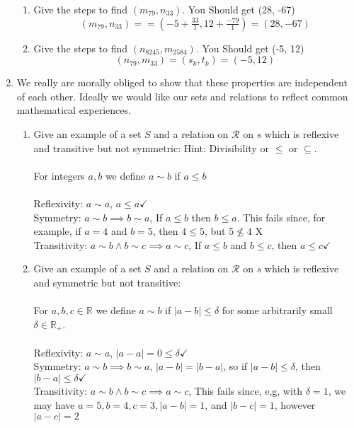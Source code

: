 \documentclass[11pt]{article}
\begin{document}
\begin{enumerate}
\begin{enumerate}
\item Give the steps to find $(m_{79}, n_{33})$.  You Should get (28, -67)
\\
$$(m_{79}, n_{33}) = = (-5 + \tfrac{33}{1}, 12 + \tfrac{-79}{1}) = (28, -67)$$
\item Give the steps to find $(n_{8245}, m_{2584})$.  You Should get (-5, 12)
\\
$$(n_{79}, m_{33}) = (s_k, t_k) = (-5, 12)$$
\end{enumerate}

\newpage %
\item We really are morally obliged to show that these properties are independent of each other. Ideally we would like our sets and relations to reflect common mathematical experiences.
\begin{enumerate}
\item Give an example of a set $S$ and a relation on $\mathcal{R}$ on $s$ which is reflexive and transitive but not symmetric: Hint: Divisibility or $\leq$ or $\subseteq$.
\\
\\
For integers $a, b$ we define $a \sim b$ if $a \leq b$\\
\\Reflexivity: $a \sim a$, $a \leq a \checkmark$
\\Symmetry: $a \sim b \implies b \sim a$, If $a \leq b$ then $b \leq a$. This fails since, for example, if $a=4$ and $b = 5$, then $4 \leq 5$, but $5 \nleq 4$  X 
\\Transitivity: $a \sim b \wedge b \sim c \implies a \sim c$, If $a \leq b$ and $b \leq c$, then $a \leq c \checkmark$
\\
\item Give an example of a set $S$ and a relation on $\mathcal{R}$ on $s$ which is reflexive and symmetric but not transitive:\\
\\
For $a,b,c \in \mathbb{R}$ we define $a \sim b$ if $|a - b| \leq \delta$ for some arbitrarily small $\delta \in \mathbb{R}_+$.
\\
\\Reflexivity: $a \sim a$, $|a-a| = 0 \leq \delta \checkmark$
\\Symmetry: $a \sim b \implies b \sim a$, $|a-b| = |b-a|$, so if $|a-b| \leq \delta$, then $|b-a| \leq \delta  \checkmark$
\\Transitivity: $a \sim b \wedge b \sim c \implies a \sim c$, This fails since, e,g, with $\delta = 1$, we may have $a = 5, b = 4, c = 3, |a-b| = 1$, and $|b-c| = 1$, however $|a-c| = 2$

\end{enumerate}
\end{enumerate}
\end{document}
